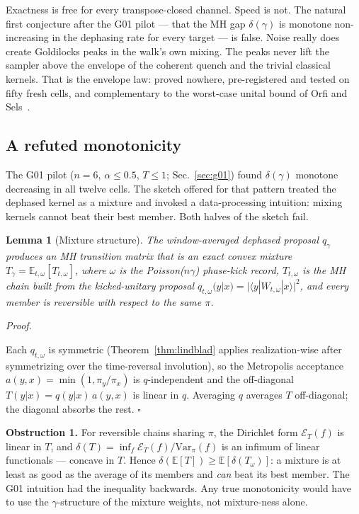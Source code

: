 \documentclass[aps,prx,reprint,floatfix,amsmath,amssymb,amsfonts]{revtex4-2}
\newtheorem{lemma}{Lemma}
\newenvironment{proof}[1][Proof]{%
  \par\medskip\noindent\textit{#1.}\ignorespaces
}{%
  \unskip\nobreak\hfill$\square$\par\medskip
}
\begin{document}
Exactness is free for every transpose-closed channel. Speed is not. The
natural first conjecture after the G01 pilot --- that the MH gap
$\delta(\gamma)$ is monotone non-increasing in the dephasing rate for
every target --- is false. Noise really does create Goldilocks peaks in
the walk's own mixing. The peaks never lift the sampler above the
envelope of the coherent quench and the trivial classical kernels. That
is the envelope law: proved nowhere, pre-registered and tested on fifty
fresh cells, and complementary to the worst-case unital bound of Orfi
and Sels~\cite{OrfiSels2024}.

\subsection{A refuted monotonicity}

The G01 pilot ($n=6$, $\alpha\le 0.5$, $T\le 1$;
Sec.~\ref{sec:g01}) found $\delta(\gamma)$ monotone decreasing in all
twelve cells. The sketch offered for that pattern treated the dephased
kernel as a mixture and invoked a data-processing intuition: mixing
kernels cannot beat their best member. Both halves of the sketch fail.

\begin{lemma}[Mixture structure]
The window-averaged dephased proposal $q_\gamma$ produces an MH
transition matrix that is an exact convex mixture
$T_\gamma = \mathbb{E}_{t,\omega}[T_{t,\omega}]$, where $\omega$ is the
Poisson($n\gamma$) phase-kick record, $T_{t,\omega}$ is the MH chain
built from the kicked-unitary proposal
$q_{t,\omega}(y|x) = |\langle y|W_{t,\omega}|x\rangle|^2$, and every
member is reversible with respect to the same $\pi$.
\end{lemma}

\begin{proof}
Each $q_{t,\omega}$ is symmetric (Theorem~\ref{thm:lindblad} applies
realization-wise after symmetrizing over the time-reversal involution),
so the Metropolis acceptance $a(y,x)=\min(1,\pi_y/\pi_x)$ is
$q$-independent and the off-diagonal $T(y|x)=q(y|x)\,a(y,x)$ is linear
in $q$. Averaging $q$ averages $T$ off-diagonal; the diagonal absorbs
the rest.
\end{proof}

\noindent\textbf{Obstruction 1.}
For reversible chains sharing $\pi$, the Dirichlet form
$\mathcal{E}_T(f)$ is linear in $T$, and
$\delta(T)=\inf_f \mathcal{E}_T(f)/\mathrm{Var}_\pi(f)$ is an infimum of
linear functionals --- concave in $T$. Hence
$\delta(\mathbb{E}[T]) \ge \mathbb{E}[\delta(T_\omega)]$: a mixture is
at least as good as the average of its members and \emph{can} beat its
best member. The G01 intuition had the inequality backwards. Any true
monotonicity would have to use the $\gamma$-structure of the mixture
weights, not mixture-ness alone.
\end{document}
